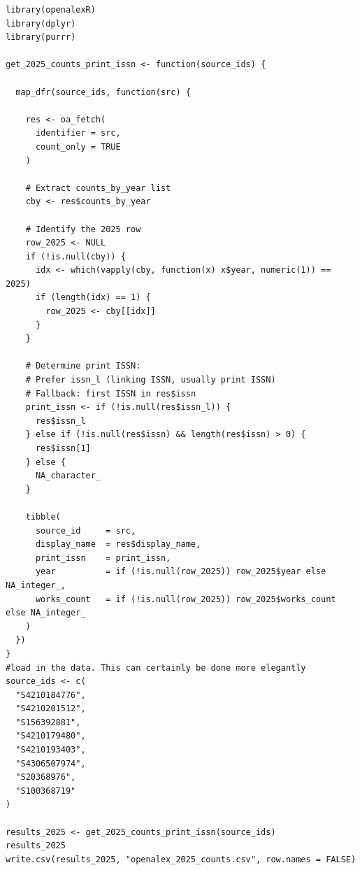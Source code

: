 \documentclass[10pt,a4paper]{article}
\begin{document}
\begin{verbatim}
library(openalexR)
library(dplyr)
library(purrr)

get_2025_counts_print_issn <- function(source_ids) {
  
  map_dfr(source_ids, function(src) {
    
    res <- oa_fetch(
      identifier = src,
      count_only = TRUE
    )
    
    # Extract counts_by_year list
    cby <- res$counts_by_year
    
    # Identify the 2025 row
    row_2025 <- NULL
    if (!is.null(cby)) {
      idx <- which(vapply(cby, function(x) x$year, numeric(1)) == 2025)
      if (length(idx) == 1) {
        row_2025 <- cby[[idx]]
      }
    }
    
    # Determine print ISSN:
    # Prefer issn_l (linking ISSN, usually print ISSN)
    # Fallback: first ISSN in res$issn
    print_issn <- if (!is.null(res$issn_l)) {
      res$issn_l
    } else if (!is.null(res$issn) && length(res$issn) > 0) {
      res$issn[1]
    } else {
      NA_character_
    }
    
    tibble(
      source_id     = src,
      display_name  = res$display_name,
      print_issn    = print_issn,
      year          = if (!is.null(row_2025)) row_2025$year else NA_integer_,
      works_count   = if (!is.null(row_2025)) row_2025$works_count else NA_integer_
    )
  })
}
#load in the data. This can certainly be done more elegantly
source_ids <- c(
  "S4210184776",
  "S4210201512",
  "S156392881",
  "S4210179480",
  "S4210193403",
  "S4306507974",
  "S20368976",
  "S100368719"
)

results_2025 <- get_2025_counts_print_issn(source_ids)
results_2025
write.csv(results_2025, "openalex_2025_counts.csv", row.names = FALSE)
\end{verbatim}
\end{document}

